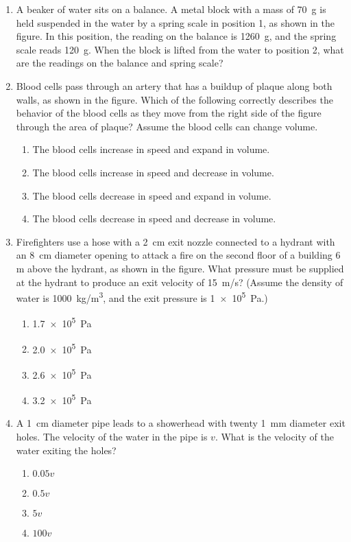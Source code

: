 \documentclass{../../oss-apphys}
\begin{document}
\begin{multicols}{2}
\begin{enumerate}[leftmargin=18pt,start=3]
  \item A beaker of water sits on a balance. A metal block with a mass of
    \SI{70}{\gram} is held suspended in the water by a spring scale in position
    1, as shown in the figure. In this position, the reading on the balance is
    \SI{1260}{\gram}, and the spring scale reads \SI{120}{g}. When the block is
    lifted from the water to position 2, what are the readings on the balance
    and spring scale?

  \item Blood cells pass through an artery that has a buildup of plaque along
    both walls, as shown in the figure. Which of the following correctly
    describes the behavior of the blood cells as they move from the right
    side of the figure through the area of plaque? Assume the blood cells
    can change volume.
    \begin{enumerate}[noitemsep,topsep=0pt,leftmargin=18pt,label=(\Alph*)]
    \item The blood cells increase in speed and expand in volume.
    \item The blood cells increase in speed and decrease in volume.
    \item The blood cells decrease in speed and expand in volume.
    \item The blood cells decrease in speed and decrease in volume.
    \end{enumerate}
    
  \item Firefighters use a hose with a \SI{2}{cm} exit nozzle connected to a
    hydrant with an \SI{8}{cm} diameter opening to attack a fire on the second
    floor of a building 6 m above the hydrant, as shown in the figure. What
    pressure must be supplied at the hydrant to produce an exit velocity of
    \SI{15}{m/s}? (Assume the density of water is \SI{1000}{kg/m^3}, and the
    exit pressure is \SI{1e5}{\pascal}.)
    \begin{enumerate}[noitemsep,topsep=0pt,leftmargin=18pt,label=(\Alph*)]
    \item\SI{1.7e5}{\pascal}
    \item\SI{2.0e5}{\pascal}
    \item\SI{2.6e5}{\pascal}
    \item\SI{3.2e5}{\pascal}
    \end{enumerate}
    
  \item A \SI{1}{cm} diameter pipe leads to a showerhead with twenty \SI{1}{mm}
    diameter exit holes. The velocity of the water in the pipe is $v$. What is
    the velocity of the water exiting the holes?
    \begin{enumerate}[noitemsep,topsep=0pt,leftmargin=18pt,label=(\Alph*)]
    \item $0.05v$
    \item $0.5v$
    \item $5v$
    \item $100v$
    \end{enumerate}


\end{enumerate}
\end{multicols}
\end{document}
